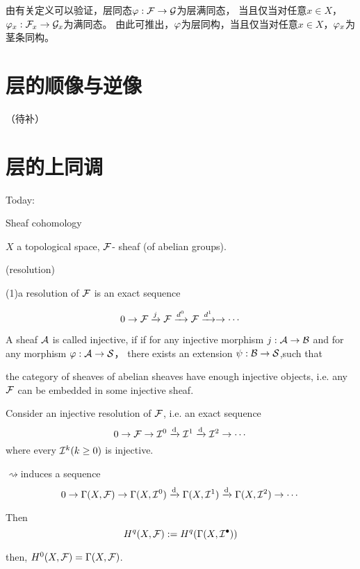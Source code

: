 由有关定义可以验证，层同态$\varphi:\mathcal{F}\to\mathcal{G}$为层满同态，
当且仅当对任意$x\in X$，$\varphi_x:\mathcal{F}_x\to\mathcal{G}_x$为满同态。
由此可推出，$\varphi$为层同构，当且仅当对任意$x\in X$，$\varphi_x$为茎条同构。

\section{层的顺像与逆像}

（待补）

\section{层的上同调}
Today:

Sheaf cohomology

$X$ a topological space, $\mathcal{F}$- sheaf (of abelian groups).

\begin{definition}  (resolution)

(1)a resolution of $\mathcal{F}$ is an exact sequence

$$0\to \mathcal{F}\xrightarrow{j}\mathcal{F}\xrightarrow{d^0}\mathcal{F}\xrightarrow{d^1}\to\cdots$$

\end{definition}

\begin{definition}
A sheaf $\mathcal{A}$ is called injective, if
if for any injective morphism $j:\mathcal{A}\to \mathcal{B}$
and for any morphism $\varphi:\mathcal{A}\to\mathcal{S}$，
there exists an extension $\psi :\mathcal{B}\to \mathcal{S}$,such that
\end{definition}
\begin{thm}
the category of sheaves of abelian sheaves have enough
injective objects, i.e.  any $\mathcal{F}$ can be
embedded in some injective sheaf.
\end{thm}

\begin{definition}
Consider an injective resolution of $\mathcal{F}$, i.e. an exact sequence
$$0\to\mathcal{F}\to\mathcal{I}^0\xrightarrow{\mathrm{d}}\mathcal{I}^1\xrightarrow{\mathrm{d}}\mathcal{I}^2\to\cdots$$
where every $\mathcal{I}^k(k\geq 0)$ is injective.


$\rightsquigarrow $induces a sequence
$$0\to\Gamma(X,\mathcal{F})
\to\Gamma(X,\mathcal{I}^0)\xrightarrow{\mathrm{d}}
\Gamma(X,\mathcal{I}^1)\xrightarrow{\mathrm{d}}
\Gamma(X,\mathcal{I}^2)\to\cdots$$

Then
$$H^q(X,\mathcal{F}):=H^q(\Gamma(X,\mathcal{I}^{\bullet}))$$

\end{definition}

then, $H^0(X,\mathcal{F})=\Gamma(X,\mathcal{F})$.

